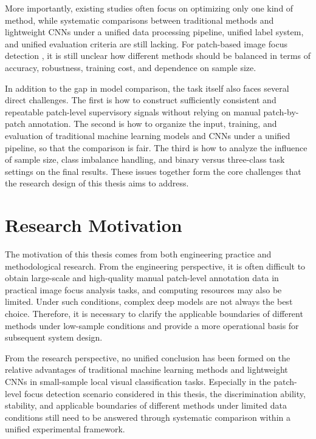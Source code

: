 \par More importantly, existing studies often focus on optimizing only one kind
of method, while systematic comparisons between traditional methods and
lightweight CNNs under a unified data processing pipeline, unified label
system, and unified evaluation criteria are still lacking. For patch-based
image focus detection \cite{Hou_2016_CVPR}, it is still unclear how different
methods should be balanced in terms of accuracy, robustness, training cost, and
dependence on sample size.

\par In addition to the gap in model comparison, the task itself also faces
several direct challenges. The first is how to construct sufficiently
consistent and repeatable patch-level supervisory signals without relying on
manual patch-by-patch annotation. The second is how to organize the input,
training, and evaluation of traditional machine learning models
\cite{murphy2022pml} and CNNs under a unified pipeline, so that the comparison
is fair. The third is how to analyze the influence of sample size, class
imbalance handling, and binary versus three-class task settings on the final
results. These issues together form the core challenges that the research
design of this thesis aims to address.

\section{Research Motivation}

\par The motivation of this thesis comes from both engineering practice and
methodological research. From the engineering perspective, it is often
difficult to obtain large-scale and high-quality manual patch-level annotation
data in practical image focus analysis tasks, and computing resources may also
be limited. Under such conditions, complex deep models are not always the best
choice. Therefore, it is necessary to clarify the applicable boundaries of
different methods under low-sample conditions and provide a more operational
basis for subsequent system design.

\par From the research perspective, no unified conclusion has been formed on
the relative advantages of traditional machine learning methods and lightweight
CNNs in small-sample local visual classification tasks. Especially in the
patch-level focus detection scenario considered in this thesis, the
discrimination ability, stability, and applicable boundaries of different
methods under limited data conditions still need to be answered through
systematic comparison within a unified experimental framework.

